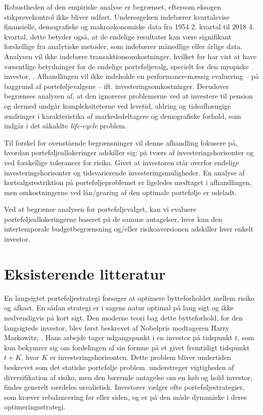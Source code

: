 \documentclass[
  a4paper,
  oneside]{memoir}
\begin{document}
Robustheden af den empiriske analyse er begrænset, eftersom eksogen stikprøvekontrol ikke bliver udført. Undersøgelsen indebærer kvartalsvise finansielle, demografiske og makroøkonomiske data fra 1954 2. kvartal til 2018 4. kvartal, dette betyder også, at de endelige resultater kan være signifikant forskellige fra analytiske metoder, som indebærer månedlige eller årlige data. Analysen vil ikke indebære transaktionsomkostninger, hvilket før har vist at have væsentlige betydninger for de endelige porteføljevalg, specielt for den myopiske investor, \citep{BalLyn1999}. Afhandlingen vil ikke indeholde en performance-mæssig evaluering -- på baggrund af porteføljevalgene -- ift. investeringsomkostninger. Derudover begrænses analysen af, at den ignorerer problemerne ved at investere til pension og dermed undgår kompleksiteterne ved levetid, aldring og tidsafhængige ændringer i karakteristika af markedsdeltagere og demografiske forhold, som indgår i det såkaldte \emph{life-cycle} problem.

Til forskel for ovenstående begrænsninger vil denne afhandling fokusere på, hvordan porteføljeallokeringer adskiller sig: på tværs af investeringshorisonter og ved forskellige tolerancer for risiko. Givet at investoren står overfor endelige investeringshorisonter og tidsvarierende investeringsmuligheder.
En analyse af kortsalgsrestriktion på porteføljeproblemet er ligeledes medtaget i afhandlingen, men omkostningerne ved lån/gearing af den optimale portefølje er udeladt.

Ved at begrænse analysen for porteføljevalget, kan vi evaluere porteføljeallokeringerne baseret på de samme antagelser, hvor kun den intertemporale budgetbegrænsning og/eller risikoaversionen adskiller hver enkelt investor.

\hypertarget{eksisterende-litteratur}{%
\section{Eksisterende litteratur}\label{eksisterende-litteratur}}

En langsigtet porteføljestrategi forsøger at optimere bytteforholdet mellem risiko og afkast. En sådan strategi er i sagens natur optimal på lang sigt og ikke nødvendigvis på kort sigt. Den moderne teori bag dette bytteforhold, for den langsigtede investor, blev først beskrevet af Nobelpris modtageren Harry Markowitz, \citep{Markowitz1952}. Hans arbejde tager udgangspunkt i en investor på tidspunkt \(t\), som kun bekymrer sig om fordelingen af sin formue på et givet fremtidigt tidspunkt \(t+K\), hvor \(K\) er investeringshorisonten. Dette problem bliver undertiden beskrevet som det statiske portefølje problem. \citep{Markowitz1952} understreger vigtigheden af diversifikation af risiko, men den bærende antagelse om en køb og hold investor, findes generelt særdeles urealistisk. Investorer vælger ofte porteføljestrategier, som kræver rebalancering før eller siden, og er på den måde dynamiske i deres optimeringsstrategi.
\end{document}
